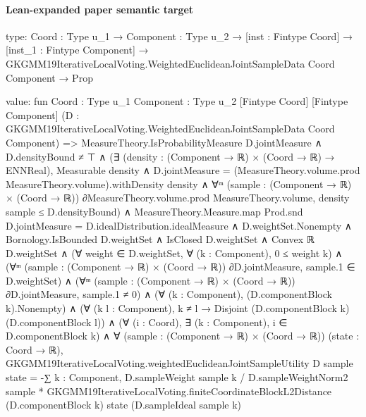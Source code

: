 \documentclass[10pt]{article}
\begin{document}
\paragraph{Lean-expanded paper semantic target}
\begin{ReviewVerbatim}
type:
{Coord : Type u_1} →
  {Component : Type u_2} →
    [inst : Fintype Coord] →
      [inst_1 : Fintype Component] → GKGMM19IterativeLocalVoting.WeightedEuclideanJointSampleData Coord Component → Prop

value:
fun {Coord : Type u_1} {Component : Type u_2} [Fintype Coord] [Fintype Component]
    (D : GKGMM19IterativeLocalVoting.WeightedEuclideanJointSampleData Coord Component) =>
  MeasureTheory.IsProbabilityMeasure D.jointMeasure ∧
    D.densityBound ≠ ⊤ ∧
      (∃ (density : (Component → ℝ) × (Coord → ℝ) → ENNReal),
          Measurable density ∧
            D.jointMeasure = (MeasureTheory.volume.prod MeasureTheory.volume).withDensity density ∧
              ∀ᵐ (sample : (Component → ℝ) × (Coord → ℝ)) ∂MeasureTheory.volume.prod MeasureTheory.volume,
                density sample ≤ D.densityBound) ∧
        MeasureTheory.Measure.map Prod.snd D.jointMeasure = D.idealDistribution.idealMeasure ∧
          D.weightSet.Nonempty ∧
            Bornology.IsBounded D.weightSet ∧
              IsClosed D.weightSet ∧
                Convex ℝ D.weightSet ∧
                  (∀ weight ∈ D.weightSet, ∀ (k : Component), 0 ≤ weight k) ∧
                    (∀ᵐ (sample : (Component → ℝ) × (Coord → ℝ)) ∂D.jointMeasure, sample.1 ∈ D.weightSet) ∧
                      (∀ᵐ (sample : (Component → ℝ) × (Coord → ℝ)) ∂D.jointMeasure, sample.1 ≠ 0) ∧
                        (∀ (k : Component), (D.componentBlock k).Nonempty) ∧
                          (∀ (k l : Component), k ≠ l → Disjoint (D.componentBlock k) (D.componentBlock l)) ∧
                            (∀ (i : Coord), ∃ (k : Component), i ∈ D.componentBlock k) ∧
                              ∀ (sample : (Component → ℝ) × (Coord → ℝ)) (state : Coord → ℝ),
                                GKGMM19IterativeLocalVoting.weightedEuclideanJointSampleUtility D sample state =
                                  -∑ k : Component,
                                      D.sampleWeight sample k / D.sampleWeightNorm2 sample *
                                        GKGMM19IterativeLocalVoting.finiteCoordinateBlockL2Distance (D.componentBlock k)
                                          state (D.sampleIdeal sample k)
\end{ReviewVerbatim}
\end{document}
